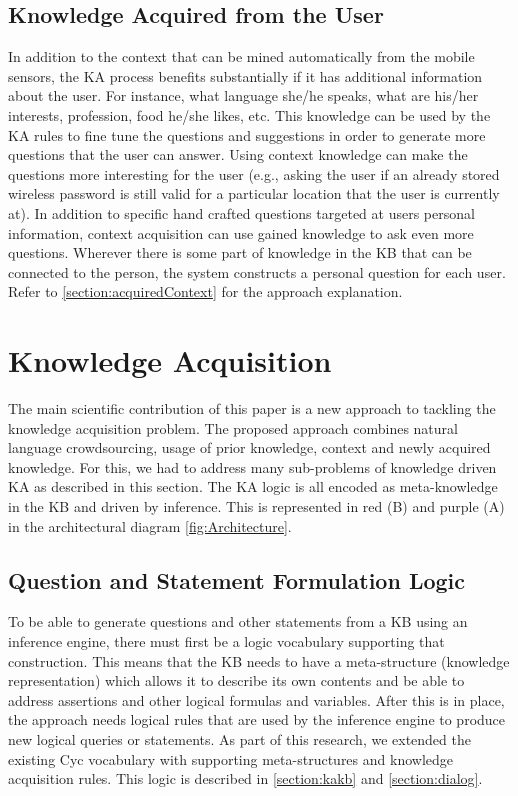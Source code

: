 \subsection{Knowledge Acquired from the User}
\label{section:bg:contextm}
In addition to the context that can be mined automatically from the mobile 
sensors, the KA process benefits substantially if it has additional information
about the user. For instance, what language she/he speaks, what are his/her 
interests, profession, food he/she likes, etc. This knowledge can be used by 
the KA rules to fine tune the questions and suggestions in order to generate 
more questions that the user can answer. Using context knowledge can make 
the questions more interesting for the user (e.g., asking the user if an 
already stored wireless password is still valid for a particular location that 
the user is currently at). In addition to specific hand crafted questions 
targeted at users personal information, context acquisition can use gained 
knowledge to ask even more questions. Wherever there is some part of knowledge 
in the KB that can be connected to the person, the system constructs a 
personal question for each user. Refer to \autoref{section:acquiredContext} for
the approach explanation.

\section{Knowledge Acquisition}
\label{section:bg:ka}
The main scientific contribution of this paper is a new approach to tackling 
the knowledge acquisition problem. The proposed approach combines natural 
language crowdsourcing, usage of prior knowledge, context and newly acquired 
knowledge. For this, we had to address many sub-problems of knowledge driven 
KA as described in this section. The KA logic is all encoded as meta-knowledge 
in the KB and driven by inference. This is represented in red (B) and purple 
(A) in the architectural diagram \autoref{fig:Architecture}.

\subsection{Question and Statement Formulation Logic} 
To be able to generate questions and other statements from a KB using an 
inference engine, there must first be a logic vocabulary supporting that 
construction. This means that the KB needs to have a meta-structure 
(knowledge representation) which allows it to describe its own contents and be
able to address assertions and other logical formulas and variables. After this
is in place, the approach needs logical rules that are used by the inference
engine to produce new logical queries or statements. As part of this research, 
we extended the existing Cyc vocabulary with supporting meta-structures and 
knowledge acquisition rules. This logic is described in \autoref{section:kakb}
and \autoref{section:dialog}.

